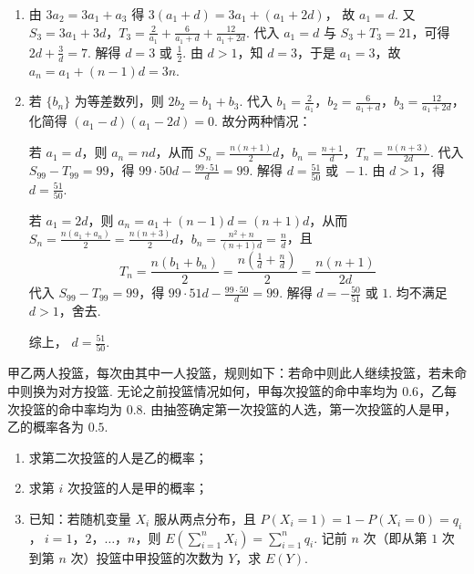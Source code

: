 \begin{solution}
\begin{enumerate}
\item 由
\(3a_2=3a_1+a_3\)
得
\(3(a_1+d)=3a_1+(a_1+2d)\)，
故
\(a_1=d\).
又
\(S_3=3a_1+3d\)，\(T_3=\frac{2}{a_1}+\frac{6}{a_1+d}+\frac{12}{a_1+2d}\).
代入 \(a_1=d\) 与 \(S_3+T_3=21\)，可得
\(2d+\frac3d=7\).
解得
\(d=3\text{\ 或\ }\frac12\).
由 \(d>1\)，知 \(d=3\)，于是 \(a_1=3\)，故
\(a_n=a_1+(n-1)d=3n\).

\item 若 \(\{b_n\}\) 为等差数列，则
\(2b_2=b_1+b_3\).
代入
\(b_1=\frac{2}{a_1}\)，\(b_2=\frac{6}{a_1+d}\)，\(b_3=\frac{12}{a_1+2d}\)，
化简得
\((a_1-d)(a_1-2d)=0\).
故分两种情况：

若 \(a_1=d\)，则 \(a_n=nd\)，从而 \(S_n=\frac{n(n+1)}{2}d\)，\(b_n=\frac{n+1}{d}\)，\(T_n=\frac{n(n+3)}{2d}\).
代入 \(S_{99}-T_{99}=99\)，得
\(99\cdot 50d-\frac{99\cdot 51}{d}=99\).
解得
\(d=\frac{51}{50}\text{\ 或\ }-1\).
由 \(d>1\)，得
\(d=\frac{51}{50}\).

若 \(a_1=2d\)，则
\(a_n=a_1+(n-1)d=(n+1)d\)，从而 \(S_n=\frac{n(a_1+a_n)}{2}=\frac{n(n+3)}{2}d\)，\(b_n=\frac{n^2+n}{(n+1)d}=\frac{n}{d}\)，且
\[
T_n=\frac{n(b_1+b_n)}{2}=\frac{n\left(\frac{1}{d}+\frac{n}{d}\right)}{2}=\frac{n(n+1)}{2d}
\]
代入 \(S_{99}-T_{99}=99\)，得
\(99\cdot 51d-\frac{99\cdot 50}{d}=99\).
解得
\(d=-\frac{50}{51}\text{\ 或\ }1\).
均不满足 \(d>1\)，舍去.

综上，
\(d=\frac{51}{50}\).
\end{enumerate}
\end{solution}

\begin{problem}
甲乙两人投篮，每次由其中一人投篮，规则如下：若命中则此人继续投篮，若未命中则换为对方投篮. 无论之前投篮情况如何，甲每次投篮的命中率均为 \(0.6\)，乙每次投篮的命中率均为 \(0.8\). 由抽签确定第一次投篮的人选，第一次投篮的人是甲，乙的概率各为 \(0.5\).
\begin{enumerate}
\item 求第二次投篮的人是乙的概率；
\item 求第 \(i\) 次投篮的人是甲的概率；
\item 已知：若随机变量 \(X_i\) 服从两点分布，且 \(P(X_i=1)=1-P(X_i=0)=q_i\)，\(\ i=1\)，\(2\)，\(\dots\)，\(n\)，则 \(E\left(\sum_{i=1}^n X_i\right)=\sum_{i=1}^n q_i\).
记前 \(n\) 次（即从第 \(1\) 次到第 \(n\) 次）投篮中甲投篮的次数为 \(Y\)，求 \(E(Y)\).
\end{enumerate}
\end{problem}

